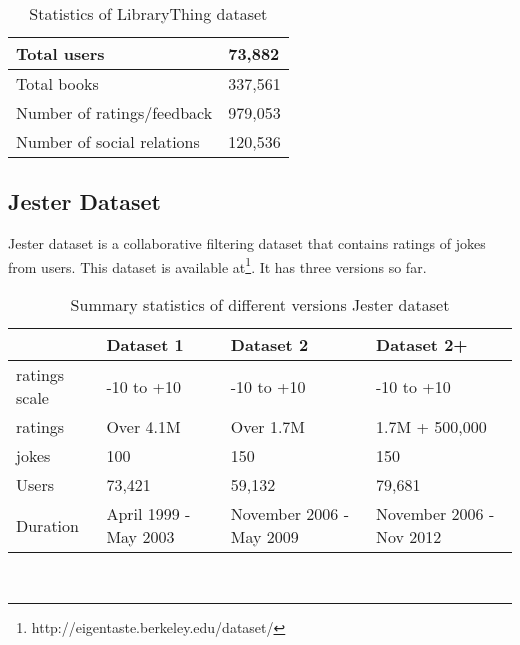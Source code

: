 \begin{table}[!htbp] 
\centering
\footnotesize
\def\arraystretch{1.4}%
\centering
\begin{tabular}{|p{8cm}|p{2cm}|}
\hline
Total users & 73,882
\\
\hline 
Total books & 337,561
\\
\hline 
Number of ratings/feedback & 979,053
\\
\hline 
Number of social relations & 120,536
\\
\hline
\end{tabular}

\caption{Statistics of LibraryThing dataset}
\label{table:12}
\end{table}

\subsection{Jester Dataset}
Jester dataset is a collaborative filtering dataset that contains ratings of jokes from users. This dataset is available at\footnote{http://eigentaste.berkeley.edu/dataset/}. It has three versions so far. 
\\
\begin{table}[!htbp] 
\centering
\footnotesize
\def\arraystretch{1.4}%
\centering
\begin{tabular}{|p{3cm}|p{3cm}|p{3cm}|p{3cm}|}
\hline
  & Dataset 1 & Dataset 2 & Dataset 2+
\\
\hline 
ratings scale & -10 to +10 & -10 to +10 & -10 to +10
\\
\hline 
ratings & Over 4.1M & Over 1.7M & 1.7M + 500,000
\\
\hline 
jokes & 100 & 150 & 150
\\
\hline 
Users & 73,421 & 59,132 & 79,681
\\
\hline
Duration & April 1999 - May 2003 & November 2006 - May 2009 &  November 2006 - Nov 2012
\\
\hline
\end{tabular}

\caption{Summary statistics of different versions Jester dataset}
\label{table:13}
\end{table}
\\
